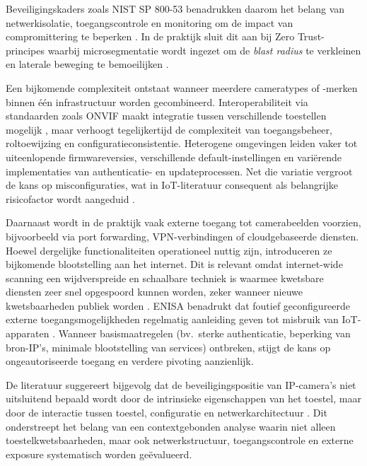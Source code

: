 Beveiligingskaders zoals NIST SP 800-53 benadrukken daarom het belang van netwerkisolatie, toegangscontrole en monitoring om de impact van compromittering te beperken \autocite{NISTSP80053r5}. In de praktijk sluit dit aan bij Zero Trust-principes waarbij microsegmentatie wordt ingezet om de \emph{blast radius} te verkleinen en laterale beweging te bemoeilijken \autocite{wonor2025zero}.

Een bijkomende complexiteit ontstaat wanneer meerdere cameratypes of -merken binnen één infrastructuur worden gecombineerd. Interoperabiliteit via standaarden zoals ONVIF maakt integratie tussen verschillende toestellen mogelijk \autocite{ONVIFCoreSpec2025}, maar verhoogt tegelijkertijd de complexiteit van toegangsbeheer, roltoewijzing en configuratieconsistentie. Heterogene omgevingen leiden vaker tot uiteenlopende firmwareversies, verschillende default-instellingen en variërende implementaties van authenticatie- en updateprocessen. Net die variatie vergroot de kans op misconfiguraties, wat in IoT-literatuur consequent als belangrijke risicofactor wordt aangeduid \autocite{Butun2019arXivIoTSecurity}.

Daarnaast wordt in de praktijk vaak externe toegang tot camerabeelden voorzien, bijvoorbeeld via port forwarding, VPN-verbindingen of cloudgebaseerde diensten. Hoewel dergelijke functionaliteiten operationeel nuttig zijn, introduceren ze bijkomende blootstelling aan het internet. Dit is relevant omdat internet-wide scanning een wijdverspreide en schaalbare techniek is waarmee kwetsbare diensten zeer snel opgespoord kunnen worden, zeker wanneer nieuwe kwetsbaarheden publiek worden \autocite{durumeric2014internet}. ENISA benadrukt dat foutief geconfigureerde externe toegangsmogelijkheden regelmatig aanleiding geven tot misbruik van IoT-apparaten \autocite{ENISA2024ThreatLandscape}. Wanneer basismaatregelen (bv.\ sterke authenticatie, beperking van bron-IP’s, minimale blootstelling van services) ontbreken, stijgt de kans op ongeautoriseerde toegang en verdere pivoting aanzienlijk.

De literatuur suggereert bijgevolg dat de beveiligingspositie van IP-camera’s niet uitsluitend bepaald wordt door de intrinsieke eigenschappen van het toestel, maar door de interactie tussen toestel, configuratie en netwerkarchitectuur \autocite{Liebl2024arXivIIoTAttackSurface,NISTSP80053r5}. Dit onderstreept het belang van een contextgebonden analyse waarin niet alleen toestelkwetsbaarheden, maar ook netwerkstructuur, toegangscontrole en externe exposure systematisch worden geëvalueerd.

